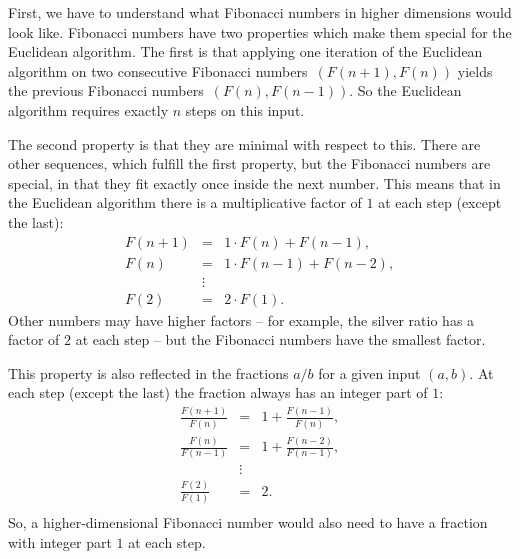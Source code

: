
First, we have to understand what Fibonacci numbers in higher dimensions would
look like.
Fibonacci numbers have two properties which make them special for the Euclidean algorithm.
The first is that applying one iteration of the Euclidean algorithm on two
consecutive Fibonacci numbers~$(F(n + 1), F(n))$ yields the previous Fibonacci numbers~$(F(n), F(n - 1))$.
So the Euclidean algorithm requires exactly $n$ steps on this input.

The second property is that they are minimal with respect to this.
There are other sequences, which fulfill the first property, but the Fibonacci
numbers are special, in that they fit exactly once inside the next number.
This means that in the Euclidean algorithm there is a multiplicative factor of $1$ at each step (except the last):
\[
  \begin{array}{rcl}
    F(n + 1) & = & 1 · F(n) + F(n - 1),     \\
    F(n)     & = & 1 · F(n - 1) + F(n - 2), \\
             & ⋮ &                          \\
    F(2)     & = & 2 · F(1).
  \end{array}
\]
Other numbers may have higher factors -- for example, the silver ratio has a
factor of $2$ at each step -- but the Fibonacci numbers have the smallest factor.

This property is also reflected in the fractions $a/b$ for a given input $(a, b)$.
At each step (except the last) the fraction always has an integer part of $1$:
\[
  \begin{array}{rcl}
    \frac{F(n + 1)}{F(n)} & = & 1 + \frac{F(n - 1)}{F(n)},     \\
    \frac{F(n)}{F(n - 1)} & = & 1 + \frac{F(n - 2)}{F(n - 1)}, \\
                          & ⋮ &                                \\
    \frac{F(2)}{F(1)}     & = & 2.                              \\
  \end{array}
\]
So, a higher-dimensional Fibonacci number would also need to have a fraction
with integer part $1$ at each step.


